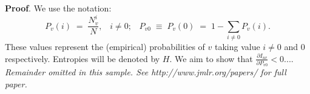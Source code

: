 \documentclass[twoside,11pt]{article}
\newcommand{\fracpartial}[2]{\frac{\partial #1}{\partial  #2}}
\begin{document}
\section{}

\noindent
{\bf Proof}. We use the notation:
\[
P_v(i) \;=\;\frac{N_v^i}{N},\;\;\;i \neq 0;\;\;\;
P_{v0}\;\equiv\;P_v(0)\; = \;1 - \sum_{i\neq 0}P_v(i).
\]
These values represent the (empirical) probabilities of $v$
taking value $i\neq 0$ and 0 respectively.  Entropies will be denoted
by $H$. We aim to show that $\fracpartial{I_{uv}}{P_{v0}} < 0$....\\

{\noindent \em Remainder omitted in this sample. See http://www.jmlr.org/papers/ for full paper.}


\vskip 0.2in

\end{document}
